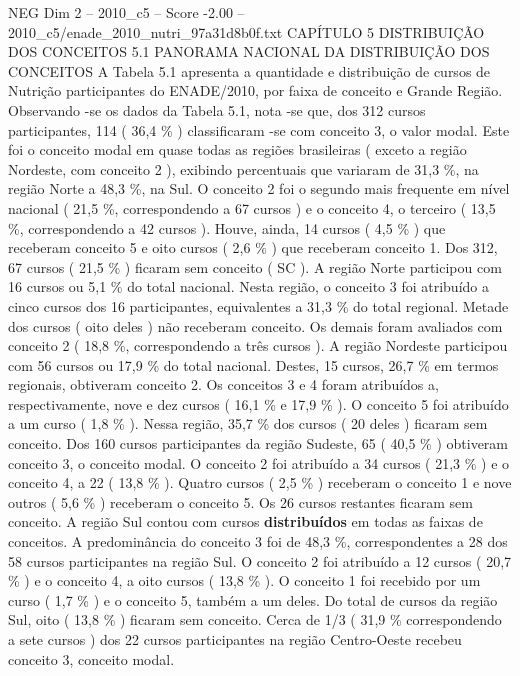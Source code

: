 \begin{textsample}{NEG Dim 2 – 2010\_c5 – Score -2.00 – 2010\_c5/enade\_2010\_nutri\_97a31d8b0f.txt}  \label{ex:f2_neg_106}
CAPÍTULO 5 DISTRIBUIÇÃO DOS CONCEITOS 5.1 PANORAMA NACIONAL DA DISTRIBUIÇÃO DOS CONCEITOS A Tabela 5.1 apresenta a quantidade e distribuição de cursos de Nutrição participantes do ENADE/2010, por faixa de conceito e Grande Região.
Observando -se os dados da Tabela 5.1, nota -se que, dos 312 cursos participantes, 114 ( 36,4 \% ) classificaram -se com conceito 3, o valor modal.
Este foi o conceito modal em quase todas as regiões brasileiras ( exceto a região Nordeste, com conceito 2 ), exibindo percentuais que variaram de 31,3 \%, na região Norte a 48,3 \%, na Sul.
O conceito 2 foi o segundo mais frequente em nível nacional ( 21,5 \%, correspondendo a 67 cursos ) e o conceito 4, o terceiro ( 13,5 \%, correspondendo a 42 cursos ).
Houve, ainda, 14 cursos ( 4,5 \% ) que receberam conceito 5 e oito cursos ( 2,6 \% ) que receberam conceito 1.
Dos 312, 67 cursos ( 21,5 \% ) ficaram sem conceito ( SC ).
A região Norte participou com 16 cursos ou 5,1 \% do total nacional.
Nesta região, o conceito 3 foi atribuído a cinco cursos dos 16 participantes, equivalentes a 31,3 \% do total regional.
Metade dos cursos ( oito deles ) não receberam conceito.
Os demais foram avaliados com conceito 2 ( 18,8 \%, correspondendo a três cursos ).
A região Nordeste participou com 56 cursos ou 17,9 \% do total nacional.
Destes, 15 cursos, 26,7 \% em termos regionais, obtiveram conceito 2.
Os conceitos 3 e 4 foram atribuídos a, respectivamente, nove e dez cursos ( 16,1 \% e 17,9 \% ).
O conceito 5 foi atribuído a um curso ( 1,8 \% ).
Nessa região, 35,7 \% dos cursos ( 20 deles ) ficaram sem conceito.
Dos 160 cursos participantes da região Sudeste, 65 ( 40,5 \% ) obtiveram conceito 3, o conceito modal.
O conceito 2 foi atribuído a 34 cursos ( 21,3 \% ) e o conceito 4, a 22 ( 13,8 \% ).
Quatro cursos ( 2,5 \% ) receberam o conceito 1 e nove outros ( 5,6 \% ) receberam o conceito 5.
Os 26 cursos restantes ficaram sem conceito.
A região Sul contou com cursos \textbf{distribuídos} em todas as faixas de conceitos.
A predominância do conceito 3 foi de 48,3 \%, correspondentes a 28 dos 58 cursos participantes na região Sul.
O conceito 2 foi atribuído a 12 cursos ( 20,7 \% ) e o conceito 4, a oito cursos ( 13,8 \% ).
O conceito 1 foi recebido por um curso ( 1,7 \% ) e o conceito 5, também a um deles.
Do total de cursos da região Sul, oito ( 13,8 \% ) ficaram sem conceito.
Cerca de 1/3 ( 31,9 \% correspondendo a sete cursos ) dos 22 cursos participantes na região Centro-Oeste recebeu conceito 3, conceito modal.

\end{textsample}
